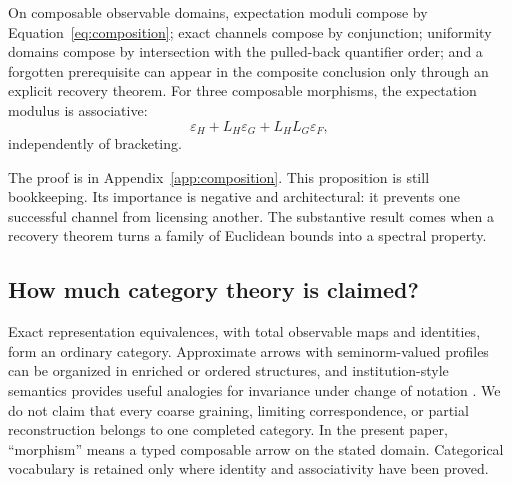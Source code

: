 \begin{proposition}
\label{prop:composition}
On composable observable domains, expectation moduli compose by
Equation~\eqref{eq:composition}; exact channels compose by conjunction;
uniformity domains compose by intersection with the pulled-back quantifier
order; and a forgotten prerequisite can appear in the composite conclusion
only through an explicit recovery theorem.  For three composable morphisms,
the expectation modulus is associative:
\[
 \varepsilon_H+L_H\varepsilon_G+L_HL_G\varepsilon_F,
\]
independently of bracketing.
\end{proposition}

The proof is in Appendix~\ref{app:composition}.  This proposition is still
bookkeeping.  Its importance is negative and architectural: it prevents one
successful channel from licensing another.  The substantive result comes
when a recovery theorem turns a family of Euclidean bounds into a spectral
property.

\subsection{How much category theory is claimed?}

Exact representation equivalences, with total observable maps and identities,
form an ordinary category.  Approximate arrows with seminorm-valued profiles
can be organized in enriched or ordered structures, and institution-style
semantics provides useful analogies for invariance under change of notation
\cite{GoguenBurstall1992}.  We do not claim that every coarse graining,
limiting correspondence, or partial reconstruction belongs to one completed
category.  In the present paper, ``morphism'' means a typed composable arrow
on the stated domain.  Categorical vocabulary is retained only where identity
and associativity have been proved.
